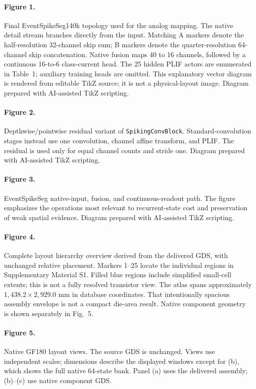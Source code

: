 \paragraph{Figure 1.} Final EventSpikeSeg140k topology used for the analog mapping. The native detail stream branches directly from the input. Matching A markers denote the half-resolution 32-channel skip sum; B markers denote the quarter-resolution 64-channel skip concatenation. Native fusion maps 40 to 16 channels, followed by a continuous 16-to-6 class-current head. The 25 hidden PLIF actors are enumerated in Table~1; auxiliary training heads are omitted. This explanatory vector diagram is rendered from editable TikZ source; it is not a physical-layout image. Diagram prepared with AI-assisted TikZ scripting.

\paragraph{Figure 2.} Depthwise/pointwise residual variant of \texttt{SpikingConvBlock}. Standard-convolution stages instead use one convolution, channel affine transform, and PLIF. The residual is used only for equal channel counts and stride one. Diagram prepared with AI-assisted TikZ scripting.

\paragraph{Figure 3.} EventSpikeSeg native-input, fusion, and continuous-readout path. The figure emphasizes the operations most relevant to recurrent-state cost and preservation of weak spatial evidence. Diagram prepared with AI-assisted TikZ scripting.

\paragraph{Figure 4.} Complete layout hierarchy overview derived from the delivered GDS, with unchanged relative placement. Markers 1--25 locate the individual regions in Supplementary Material S1. Filled blue regions include simplified small-cell extents; this is not a fully resolved transistor view. The atlas spans approximately $1{,}438.2\times2{,}929.0$ mm in database coordinates. That intentionally spacious assembly envelope is not a compact die-area result. Native component geometry is shown separately in Fig.~5.

\paragraph{Figure 5.} Native GF180 layout views. The source GDS is unchanged. Views use independent scales; dimensions describe the displayed windows except for (b), which shows the full native 64-state bank. Panel (a) uses the delivered assembly; (b)--(c) use native component GDS.

